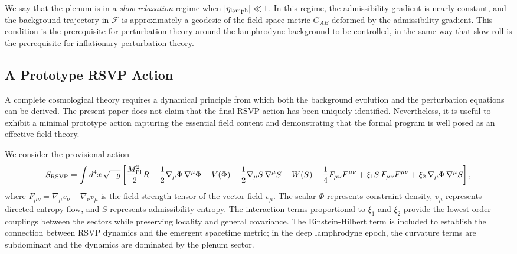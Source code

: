 \documentclass[12pt, a4paper]{article}
\newcommand{\calF}{\mathcal{F}}
\newcommand{\etalamph}{\eta_{\rm lamph}}
\begin{document}
We say that the plenum is in a \emph{slow relaxation} regime when
$|\etalamph| \ll 1$. In this regime, the admissibility gradient is nearly constant,
and the background trajectory in $\calF$ is approximately a geodesic of the
field-space metric $G_{AB}$ deformed by the admissibility gradient. This condition
is the prerequisite for perturbation theory around the lamphrodyne background to be
controlled, in the same way that slow roll is the prerequisite for inflationary
perturbation theory.


\subsection{A Prototype RSVP Action}
\label{sec:action}

A complete cosmological theory requires a dynamical principle from which both the
background evolution and the perturbation equations can be derived. The present
paper does not claim that the final RSVP action has been uniquely identified.
Nevertheless, it is useful to exhibit a minimal prototype action capturing the
essential field content and demonstrating that the formal program is well posed as
an effective field theory.

We consider the provisional action
\begin{equation}
S_{\rm RSVP} = \int d^4x\,\sqrt{-g}\left[
\frac{M_{\rm Pl}^2}{2}R
- \frac{1}{2}\nabla_\mu\Phi\,\nabla^\mu\Phi - V(\Phi)
- \frac{1}{2}\nabla_\mu S\,\nabla^\mu S - W(S)
- \frac{1}{4}F_{\mu\nu}F^{\mu\nu}
+ \xi_1 S\,F_{\mu\nu}F^{\mu\nu}
+ \xi_2\,\nabla_\mu\Phi\,\nabla^\mu S
\right],
\label{eq:action}
\end{equation}
where $F_{\mu\nu} = \nabla_\mu v_\nu - \nabla_\nu v_\mu$ is the field-strength
tensor of the vector field $v_\mu$. The scalar $\Phi$ represents constraint
density, $v_\mu$ represents directed entropy flow, and $S$ represents admissibility
entropy. The interaction terms proportional to $\xi_1$ and $\xi_2$ provide the
lowest-order couplings between the sectors while preserving locality and general
covariance. The Einstein-Hilbert term is included to establish the connection
between RSVP dynamics and the emergent spacetime metric; in the deep lamphrodyne
epoch, the curvature terms are subdominant and the dynamics are dominated by the
plenum sector.
\end{document}
